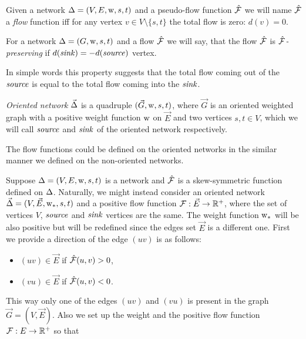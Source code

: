 \documentclass[12pt]{article}
\begin{document}
    \begin{definition}
      Given a network $\Delta = (V, E, \mathrm{w}, s, t)$ and a pseudo-flow function $\mathcal{\hat{F}}$ we will name $\mathcal{\hat{F}}$ a
        \emph{flow} function iff for any vertex $v \in V \setminus \{s,t\}$ the total flow is zero: $d(v) = 0$.
    \end{definition}
    \begin{definition}
      For a network $\Delta = (G, \mathrm{w}, s, t)$ and a flow $\mathcal{\hat{F}}$ we will say,
      that the flow $\mathcal{\hat{F}}$ is \emph{$\mathcal{\hat{F}}$-preserving} if $d(\mathit{sink}) = -d(\mathit{source})$ vertex.
    \end{definition}
    \begin{note}
      In simple words this property suggests
        that the total flow coming out of the $\mathit{source}$ is equal to the total flow
        coming into the $\mathit{sink}$.
    \end{note}
    \begin{definition}
      \emph{Oriented network} $\vec{\Delta}$ is a quadruple $(\vec{G}, \mathrm{w}, s, t)$, where
        $\vec{G}$ is an oriented weighted graph with 
        a positive weight function $\mathrm{w}$ on $\vec{E}$ and two vertices $s, t \in V$, which
        we will call $\mathit{source}$ and $\mathit{sink}$ of the oriented network respectively.
    \end{definition}
    \begin{note}
      The flow functions could be defined on the oriented networks in the similar manner
      we defined on the non-oriented networks.
    \end{note}
    Suppose $\Delta = (V, E, \mathrm{w}, s, t)$ is a network and $\mathcal{\hat{F}}$ is a skew-symmetric function defined
    on $\Delta$.
    Naturally, we might instead consider an oriented network $\vec{\Delta} = (V, \vec{E}, \mathrm{w}_{*}, s, t)$ and a 
      positive flow function $\mathcal{F}: \vec{E} \to \mathbb{R}^{+}$, where
      the set of vertices $V$, $\mathit{source}$ and $\mathit{sink}$ vertices are the same.
    The weight function $\mathrm{w}_{*}$ will be also positive but will be redefined since the edges set $\vec{E}$ is a different one.
    First we provide a direction of the edge $(uv)$ is as follows:
    \begin{itemize}
      \item $(uv) \in \vec{E}$ if $\mathcal{\hat{F}}(u, v) > 0$,
      \item $(vu) \in \vec{E}$ if $\mathcal{\hat{F}}(u, v) < 0$.
    \end{itemize}
    This way only one of the edges $(uv)$ and $(vu)$ is present in the graph $\vec{G} = (V, \vec{E})$.
    Also we set up the weight and the positive flow function $\mathcal{F}: E \to \mathbb{R}^{+}$ so that
\end{document}
